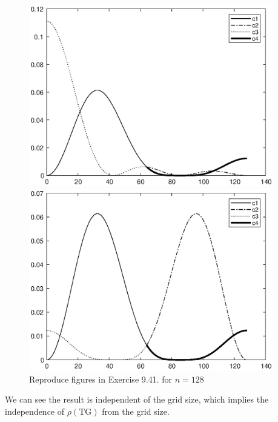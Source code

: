 \documentclass[twoside,a4paper]{article}
\begin{document}
\begin{figure}[H]
\begin{minipage}[t]{0.32\textwidth}
        \includegraphics[width=0.95\textwidth]{figure/ex9_41_22_128.eps}
        \caption*{$\nu_1=2,\nu_2=2$}
    \end{minipage}
    \begin{minipage}[t]{0.32\textwidth}
        \centering
        \includegraphics[width=0.95\textwidth]{figure/ex9_41_40_128.eps}
        \caption*{$\nu_1=4,\nu_2=0$}
    \end{minipage}
    \caption{Reproduce figures in Exercise 9.41. for $n=128$}
\end{figure}

We can see the result is independent of the grid size, which implies the independence of $\rho(\text{TG})$ from the grid size.
\end{document}
